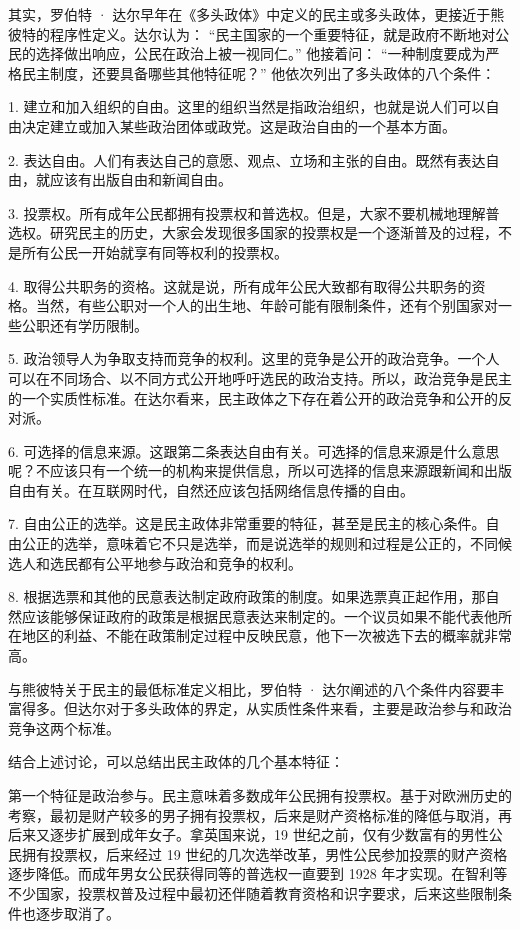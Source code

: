 其实，罗伯特 · 达尔早年在《多头政体》中定义的民主或多头政体，更接近于熊彼特的程序性定义。达尔认为： “民主国家的一个重要特征，就是政府不断地对公民的选择做出响应，公民在政治上被一视同仁。” 他接着问： “一种制度要成为严格民主制度，还要具备哪些其他特征呢？” 他依次列出了多头政体的八个条件：

1. 建立和加入组织的自由。这里的组织当然是指政治组织，也就是说人们可以自由决定建立或加入某些政治团体或政党。这是政治自由的一个基本方面。

2. 表达自由。人们有表达自己的意愿、观点、立场和主张的自由。既然有表达自由，就应该有出版自由和新闻自由。

3. 投票权。所有成年公民都拥有投票权和普选权。但是，大家不要机械地理解普选权。研究民主的历史，大家会发现很多国家的投票权是一个逐渐普及的过程，不是所有公民一开始就享有同等权利的投票权。

4. 取得公共职务的资格。这就是说，所有成年公民大致都有取得公共职务的资格。当然，有些公职对一个人的出生地、年龄可能有限制条件，还有个别国家对一些公职还有学历限制。

5. 政治领导人为争取支持而竞争的权利。这里的竞争是公开的政治竞争。一个人可以在不同场合、以不同方式公开地呼吁选民的政治支持。所以，政治竞争是民主的一个实质性标准。在达尔看来，民主政体之下存在着公开的政治竞争和公开的反对派。

6. 可选择的信息来源。这跟第二条表达自由有关。可选择的信息来源是什么意思呢？不应该只有一个统一的机构来提供信息，所以可选择的信息来源跟新闻和出版自由有关。在互联网时代，自然还应该包括网络信息传播的自由。

7. 自由公正的选举。这是民主政体非常重要的特征，甚至是民主的核心条件。自由公正的选举，意味着它不只是选举，而是说选举的规则和过程是公正的，不同候选人和选民都有公平地参与政治和竞争的权利。

8. 根据选票和其他的民意表达制定政府政策的制度。如果选票真正起作用，那自然应该能够保证政府的政策是根据民意表达来制定的。一个议员如果不能代表他所在地区的利益、不能在政策制定过程中反映民意，他下一次被选下去的概率就非常高。

与熊彼特关于民主的最低标准定义相比，罗伯特 · 达尔阐述的八个条件内容要丰富得多。但达尔对于多头政体的界定，从实质性条件来看，主要是政治参与和政治竞争这两个标准。

结合上述讨论，可以总结出民主政体的几个基本特征：

第一个特征是政治参与。民主意味着多数成年公民拥有投票权。基于对欧洲历史的考察，最初是财产较多的男子拥有投票权，后来是财产资格标准的降低与取消，再后来又逐步扩展到成年女子。拿英国来说，19 世纪之前，仅有少数富有的男性公民拥有投票权，后来经过 19 世纪的几次选举改革，男性公民参加投票的财产资格逐步降低。而成年男女公民获得同等的普选权一直要到 1928 年才实现。在智利等不少国家，投票权普及过程中最初还伴随着教育资格和识字要求，后来这些限制条件也逐步取消了。

